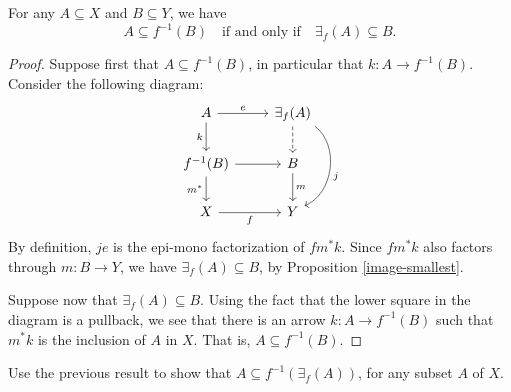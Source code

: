 \begin{prop} For any $A\subseteq X$ and $B\subseteq Y$, we have 
  \[ A\subseteq f^{-1}(B) \quad \text{if and only if} \quad \exists
  _f(A)\subseteq B .\] \end{prop}

\begin{proof} Suppose first that $A\subseteq f^{-1}(B)$, in particular
  that $k:A\to f^{-1}(B)$.  Consider the following diagram:
  \[ \begin{tikzcd}
    A \arrow{d}[left]{k} \arrow{r}{e} & \exists _f(A) \arrow[bend left=60]{dd}{j} \arrow[dashed]{d} \\
    f^{-1}(B) \arrow{d}[left]{m^*} \arrow{r} & B \arrow{d}{m} \\
    X \arrow{r}[below]{f} & Y \end{tikzcd} \] By definition, $je$ is the
  epi-mono factorization of $fm^*k$.  Since $fm^*k$ also factors
  through $m:B\to Y$, we have $\exists _f(A)\subseteq B$, by
  Proposition \ref{image-smallest}.

Suppose now that $\exists _f(A)\subseteq B$.  Using the fact that the
lower square in the diagram is a pullback, we see that there is an
arrow $k:A\to f^{-1}(B)$ such that $m^*k$ is the inclusion of $A$ in
$X$.  That is, $A\subseteq f^{-1}(B)$.  
\end{proof}

\begin{exercise} Use the previous result to show that $A\subseteq
  f^{-1}(\exists _f(A))$, for any subset $A$ of $X$. \end{exercise}














